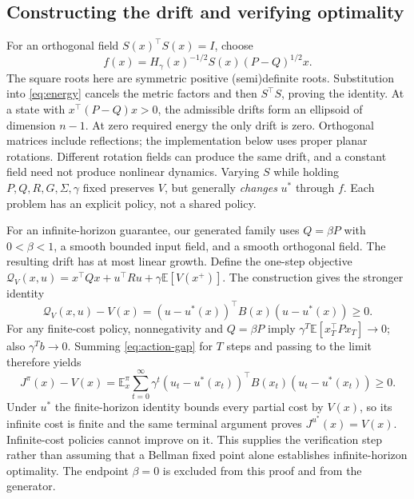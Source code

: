\documentclass[11pt]{article}
\begin{document}
\subsection{Constructing the drift and verifying optimality}

For an orthogonal field $S(x)^\top S(x)=I$, choose
\begin{equation}
 f(x)=H_\gamma(x)^{-1/2}S(x)(P-Q)^{1/2}x.
 \label{eq:energy-generator}
\end{equation}
The square roots here are symmetric positive (semi)definite roots. Substitution into
\eqref{eq:energy} cancels the metric factors and then $S^\top S$, proving the identity.
At a state with $x^\top(P-Q)x>0$, the admissible drifts form an ellipsoid of dimension
$n-1$. At zero required energy the only drift is zero. Orthogonal matrices include
reflections; the implementation below uses proper planar rotations. Different rotation fields
can produce the same drift, and a constant field need not produce nonlinear dynamics.
Varying $S$ while holding $P,Q,R,G,\Sigma,\gamma$ fixed preserves $V$, but generally
\emph{changes} $u^*$ through $f$. Each problem has an explicit policy, not a shared policy.

For an infinite-horizon guarantee, our generated family uses $Q=\beta P$ with
$0<\beta<1$, a smooth bounded input field, and a smooth orthogonal field.
The resulting drift has at most linear growth. Define the one-step objective
$\mathcal Q_V(x,u)=x^\top Qx+u^\top Ru+\gamma\mathbb E[V(x^+)]$.
The construction gives the stronger identity
\begin{equation}
 \mathcal Q_V(x,u)-V(x)=(u-u^*(x))^\top B(x)(u-u^*(x))\geq0.
 \label{eq:action-gap}
\end{equation}
For any finite-cost policy, nonnegativity and $Q=\beta P$ imply
$\gamma^T\mathbb E[x_T^\top Px_T]\to0$; also $\gamma^T b\to0$.
Summing \eqref{eq:action-gap} for $T$ steps and passing to the limit therefore yields
\begin{equation}
 J^\pi(x)-V(x)=\mathbb E_x^\pi\sum_{t=0}^{\infty}\gamma^t
 (u_t-u^*(x_t))^\top B(x_t)(u_t-u^*(x_t))\geq0.
\end{equation}
Under $u^*$ the finite-horizon identity bounds every partial cost by $V(x)$, so its
infinite cost is finite and the same terminal argument proves $J^{u^*}(x)=V(x)$.
Infinite-cost policies cannot improve on it. This supplies the verification step rather
than assuming that a Bellman fixed point alone establishes infinite-horizon optimality.
The endpoint $\beta=0$ is excluded from this proof and from the generator.
\end{document}
